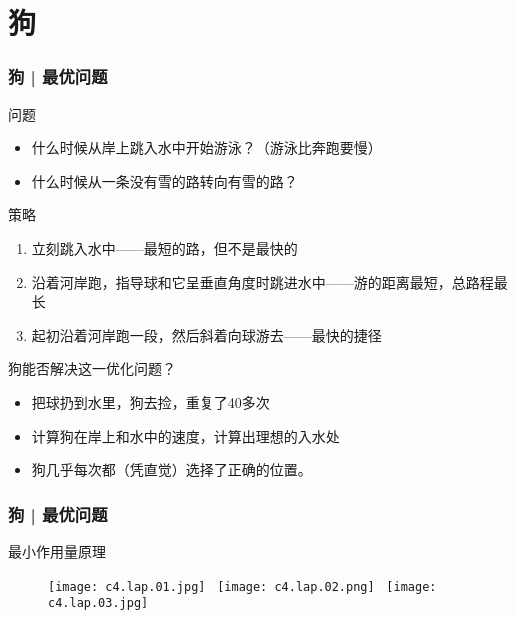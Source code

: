\section{狗}
\begin{frame}
  \frametitle{狗 | 最优问题}
  \begin{block}{问题}
    \begin{itemize}
      \item 什么时候从岸上跳入水中开始游泳？（游泳比奔跑要慢）
      \item 什么时候从一条没有雪的路转向有雪的路？
    \end{itemize}
  \end{block}
  \vspace{-0.3em}
  \pause
  \begin{block}{策略}
    \begin{enumerate}
      \item 立刻跳入水中——最短的路，但不是最快的
      \item 沿着河岸跑，指导球和它呈垂直角度时跳进水中——游的距离最短，总路程最长
      \item 起初沿着河岸跑一段，然后斜着向球游去——最快的捷径
    \end{enumerate}
  \end{block}
  \vspace{-0.3em}
  \pause
  \begin{block}{狗能否解决这一优化问题？}
    \begin{itemize}
      \item 把球扔到水里，狗去捡，重复了40多次
      \item 计算狗在岸上和水中的速度，计算出理想的入水处
      \item 狗几乎每次都（凭直觉）选择了正确的位置。
    \end{itemize}
  \end{block}
\end{frame}

\begin{frame}
  \frametitle{狗 | 最优问题}
  \begin{block}{最小作用量原理}
    \begin{figure}
      \centering
      \texttt{[image: c4.lap.01.jpg]} \ 
      \texttt{[image: c4.lap.02.png]} \ 
      \texttt{[image: c4.lap.03.jpg]}
    \end{figure}
  \end{block}
\end{frame}

